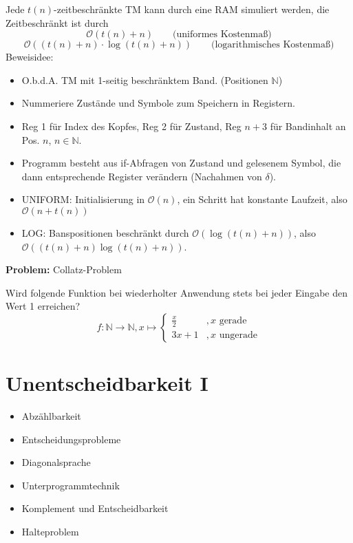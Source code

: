 \documentclass[a4paper,graphics,11pt]{article}
\begin{document}
Jede $t(n)$-zeitbeschränkte TM kann durch eine RAM simuliert werden,
die Zeitbeschränkt ist durch
$$
    \mathcal{O}(t(n)+n)\qquad \text{(uniformes Kostenmaß)}
$$$$
    \mathcal{O}((t(n)+n)\cdot \log(t(n)+n))
    \qquad \text{(logarithmisches Kostenmaß)}
$$
Beweisidee:
\begin{itemize}
    \item O.b.d.A. TM mit 1-seitig beschränktem Band. (Positionen $\mathbb{N}$)
    \item Nummeriere Zustände und Symbole zum Speichern in Registern.
    \item Reg 1 für Index des Kopfes, Reg 2 für Zustand,
        Reg $n+3$ für Bandinhalt an Pos. $n$, $n \in \mathbb{N}$.
    \item Programm besteht aus if-Abfragen von Zustand und gelesenem Symbol, die
        dann entsprechende Register verändern (Nachahmen von $\delta$).
    \item UNIFORM: Initialisierung in $\mathcal{O}(n)$, ein Schritt hat konstante Laufzeit,
        also $\mathcal{O}(n+t(n))$
    \item LOG: Banspositionen beschränkt durch $\mathcal{O}(\log(t(n)+n))$,
        also $\mathcal{O}((t(n)+n)\log(t(n)+n))$.
\end{itemize}

\strut

\textbf{Problem:} Collatz-Problem

Wird folgende Funktion bei wiederholter Anwendung stets bei jeder Eingabe
den Wert 1 erreichen?
$$
    f : \mathbb{N} \to \mathbb{N}, x \mapsto
    \begin{cases}
        \frac{x}{2} &, x \text{ gerade}\\
        3x+1 &, x \text{ ungerade}
    \end{cases}
$$


\newpage

\section{Unentscheidbarkeit I}

\begin{itemize}
    \item Abzählbarkeit
    \item Entscheidungsprobleme
    \item Diagonalsprache
    \item Unterprogrammtechnik
    \item Komplement und Entscheidbarkeit
    \item Halteproblem
\end{itemize}
\end{document}
